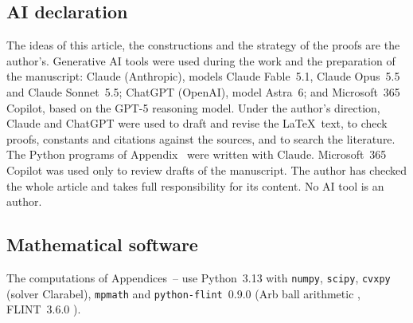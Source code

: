 \subsection*{AI declaration}
The ideas of this article, the constructions and the strategy of the proofs are the author's. Generative AI tools were used during the work and the preparation of the manuscript: Claude (Anthropic), models Claude Fable~5.1, Claude Opus~5.5 and Claude Sonnet~5.5; ChatGPT (OpenAI), model Astra~6; and Microsoft~365 Copilot, based on the GPT-5 reasoning model. Under the author's direction, Claude and ChatGPT were used to draft and revise the \LaTeX\ text, to check proofs, constants and citations against the sources, and to search the literature. The Python programs of Appendix~ were written with Claude. Microsoft~365 Copilot was used only to review drafts of the manuscript. The author has checked the whole article and takes full responsibility for its content. No AI tool is an author.

\subsection*{Mathematical software}
The computations of Appendices~-- use Python~3.13 with \texttt{numpy}, \texttt{scipy}, \texttt{cvxpy} (solver Clarabel), \texttt{mpmath} and \texttt{python-flint}~0.9.0 (Arb ball arithmetic \cite{Johansson2017}, FLINT~3.6.0 \cite{FLINT}).
